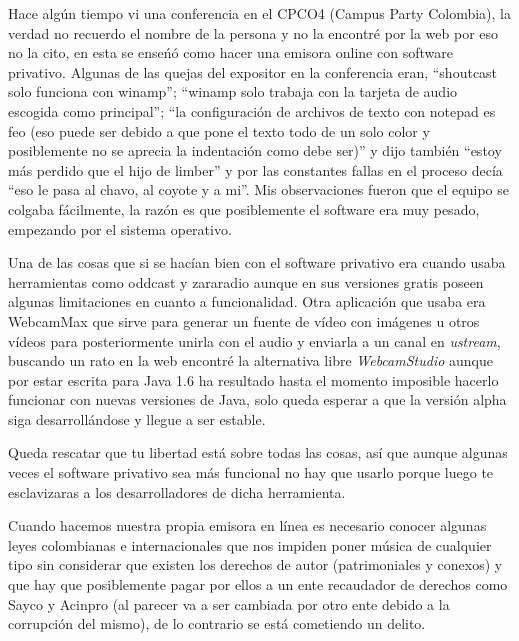 \begin{multicols}{2}
Hace algún tiempo vi una conferencia en el CPCO4 (Campus Party Colombia), la verdad no recuerdo el nombre de la persona y no la encontré por la web por eso no la cito, en esta se enseńó como hacer una emisora online con software privativo. Algunas de las quejas del expositor en la conferencia eran, ``shoutcast solo funciona con winamp''; ``winamp solo trabaja con la tarjeta de audio escogida como principal''; ``la configuración de archivos de texto con notepad es feo (eso puede ser debido a que pone el texto todo de un solo color y posiblemente no se aprecia la indentación como debe ser)'' y dijo también ``estoy más perdido que el hijo de limber'' y por las constantes fallas en el proceso decía ``eso le pasa al chavo, al coyote y a mi''. Mis observaciones fueron que el equipo se colgaba fácilmente, la razón es que posiblemente el software era muy pesado, empezando por el sistema operativo.

Una de las cosas que si se hacían bien con el software privativo era cuando usaba herramientas como oddcast y zararadio aunque en sus versiones gratis poseen algunas limitaciones en cuanto a funcionalidad. Otra aplicación que usaba era WebcamMax que sirve para generar un fuente de vídeo con imágenes u otros vídeos para posteriormente unirla con el audio y enviarla a un canal en {\em ustream}, buscando un rato en la web encontré la alternativa libre {\em WebcamStudio} aunque por estar escrita para Java 1.6 ha resultado hasta el momento imposible hacerlo funcionar con nuevas versiones de Java, solo queda esperar a que la versión alpha siga desarrollándose y llegue a ser estable.

Queda rescatar que tu libertad está sobre todas las cosas, así que aunque algunas veces el software privativo sea más funcional no hay que usarlo porque luego te esclavizaras a los desarrolladores de dicha herramienta.


Cuando hacemos nuestra propia emisora en línea es necesario conocer algunas leyes colombianas e internacionales que nos impiden poner música de cualquier tipo sin
considerar que existen los derechos de autor (patrimoniales y conexos) y que hay que posiblemente pagar por ellos a un ente recaudador de derechos como Sayco y Acinpro (al parecer va a ser cambiada por otro ente debido a la corrupción del mismo), de lo contrario se está cometiendo un delito.


\end{multicols}
